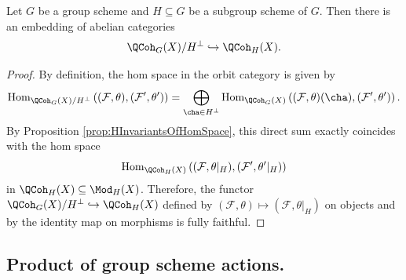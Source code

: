 \begin{crl}\label{crl:orbit-category-GH-restriction}
    Let $G$ be a group scheme and $H\subseteq G$ be a subgroup scheme of $G$. Then there is an embedding of abelian categories \[
        \QCoh_G (X)/H^{\perp}\hookrightarrow\QCoh_H (X).
    \]
\end{crl}
\begin{proof}
By definition, the hom space in the orbit category is given by
$$
\operatorname{Hom}_{\QCoh_G(X)/H^\perp}\left( (\mathcal{F}, \theta), (\mathcal{F}', \theta') \right)
=
\bigoplus_{\cha \in H^\perp} \operatorname{Hom}_{\QCoh_G(X)}\left( (\mathcal{F}, \theta)(\cha), (\mathcal{F}', \theta') \right).
$$
By Proposition \ref{prop:HInvariantsOfHomSpace},
this direct sum exactly coincides with the hom space
\[\operatorname{Hom}_{\QCoh_H(X)}
\left((\mathcal{F}, \theta|_H), (\mathcal{F}', \theta'|_H) \right)\]
in
$\QCoh_H(X)\subseteq\Mod_H(X)$.
Therefore, the functor $\QCoh_G(X)/H^\perp \hookrightarrow \QCoh_H(X)$ defined by $(\mathcal{F}, \theta) \mapsto (\mathcal{F},\theta|_H)$
on objects and by the identity map on morphisms is fully faithful.
\end{proof}

\subsection{Product of group scheme actions.}


